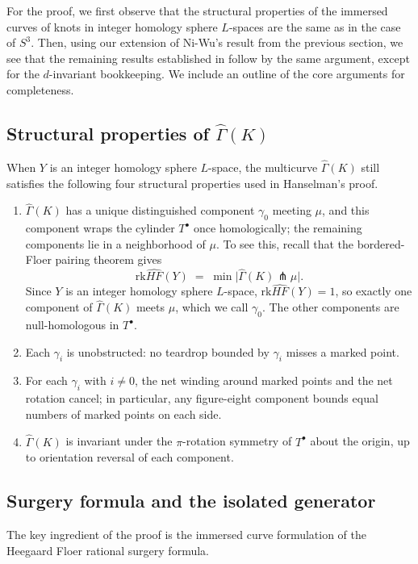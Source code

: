 \documentclass[12pt]{amsart}
\theoremstyle{definition}
\theoremstyle{definition}
\newcommand{\HFhat}{\widehat{HF}}
\newcommand{\rk}{\text{rk}}
\newcommand{\Gh}{\widehat{\Gamma}}
\newcommand{\Tpun}{T^{\bullet}}
\newcommand{\din}{d}
\begin{document}
For the proof, we first observe that the structural properties of the immersed curves of knots in integer homology sphere $L$-spaces are the same as in the case of $S^3$. Then, using our extension of Ni-Wu's result from the previous section, we see that the remaining results established in \cite{Han} follow by the same argument, except for the $\din$-invariant bookkeeping. We include an outline of the core arguments for completeness.  

\subsection{Structural properties of $\Gh(K)$}
 
When $Y$ is an integer homology sphere $L$-space, the multicurve $\Gh(K)$ still
satisfies the following four structural properties used in Hanselman's proof. 
 
\begin{enumerate}
\item[(I)] $\Gh(K)$ has a unique distinguished component $\gamma_0$
meeting $\mu$, and this component wraps the cylinder $\Tpun$ once
homologically; the remaining components lie in a neighborhood of $\mu$. To see this, recall that the bordered-Floer pairing theorem gives
\[
\rk \HFhat(Y) \;=\; \min\bigl|\Gh(K) \pitchfork \mu\bigr|.
\]
Since $Y$ is an integer homology sphere $L$-space, $\rk\HFhat(Y) = 1$, so exactly one component of $\Gh(K)$ meets $\mu$, which we call $\gamma_0$.
The other components are null-homologous in $\Tpun$.
\item[(II)] Each $\gamma_i$ is unobstructed: no teardrop bounded by
$\gamma_i$ misses a marked point.
\item[(III)] For each $\gamma_i$ with $i \neq 0$, the net winding around
marked points and the net rotation cancel; in particular, any figure-eight
component bounds equal numbers of marked points on each side.
\item[(IV)] $\Gh(K)$ is invariant under the $\pi$-rotation symmetry of
$\Tpun$ about the origin, up to orientation reversal of each component.
\end{enumerate}

\subsection{Surgery formula and the isolated generator}

The key ingredient of the proof is the immersed curve formulation of the Heegaard Floer rational surgery formula.
\end{document}

